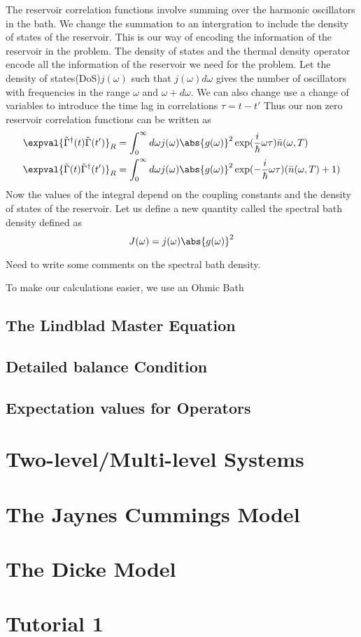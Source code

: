 \documentclass{scrartcl}
\newcommand{\1}{\mathbbm{1}}
\newcommand{\iG}{\tilde{\Gamma}}
\newcommand{\nbar}{\bar{n}}
\begin{document}
The reservoir correlation functions involve summing over the harmonic oscillators in the bath. We change the summation
to an intergration to include the density of states of the reservoir. This is our way of encoding the
information of the reservoir in the problem. The density of states and the thermal density operator encode
all the information of the reservoir we need for the problem. Let the density of states(DoS)\(j(\omega)\) such that
\(j(\omega) d\omega\) gives the number of oscillators with frequencies in the range \(\omega\) and \(\omega + d\omega\). We can also
change use a change of variables to introduce the time lag in correlations \(\tau = t-t'\)
Thus our non zero reservoir correlation functions can be written as
\begin{align}
	\expval{\iG^\dagger(t)\iG(t')}_R & = \int_0^\infty d\omega j(\omega) \abs{g(\omega)}^2 \exp(\frac{i}{\hbar} \omega \tau) \nbar(\omega,T) \label{eq: rescorr1}\\
	\expval{\iG(t)\iG^\dagger(t')}_R & = \int_0^\infty d\omega j(\omega) \abs{g(\omega)}^2 \exp(-\frac{i}{\hbar} \omega \tau) (\nbar(\omega,T)+1)
\end{align}
Now the values of the integral depend on the coupling constants and the density of states of the reservoir. Let us define a new quantity called the spectral bath density
defined as 
\begin{equation}
	J(\omega) = j(\omega) \abs{g(\omega)}^2	
\end{equation}

\begin{remark}
	Need to write some comments on the spectral bath density.
\end{remark}
To make our calculations easier, we use an Ohmic Bath 

\subsection{The Lindblad Master Equation}
\subsection{Detailed balance Condition}
\subsection{Expectation values for Operators}
\section{Two-level/Multi-level Systems}
\section{The Jaynes Cummings Model}
\section{The Dicke Model}
\section{Tutorial 1}
\end{document}
